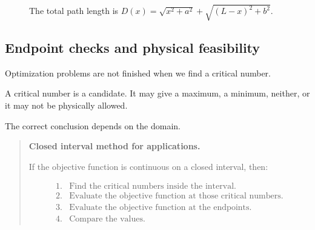 \begin{figure}[h]
\centering
{}
\caption{The total path length is \(D(x)=\sqrt{x^2+a^2}+\sqrt{(L-x)^2+b^2}\).}
\label{fig:reflection-shortest-path}
\end{figure}

\subsection{Endpoint checks and physical feasibility}
\label{subsec:endpoint-checks-physical-feasibility}

Optimization problems are not finished when we find a critical number.

A critical number is a candidate.  It may give a maximum, a minimum, neither, or it may
not be physically allowed.

The correct conclusion depends on the domain.

\begin{quote}
\textbf{Closed interval method for applications.}

If the objective function is continuous on a closed interval, then:

\[
\begin{array}{ll}
\text{1.} & \text{Find the critical numbers inside the interval.}\\
\text{2.} & \text{Evaluate the objective function at those critical numbers.}\\
\text{3.} & \text{Evaluate the objective function at the endpoints.}\\
\text{4.} & \text{Compare the values.}
\end{array}
\]
\end{quote}

